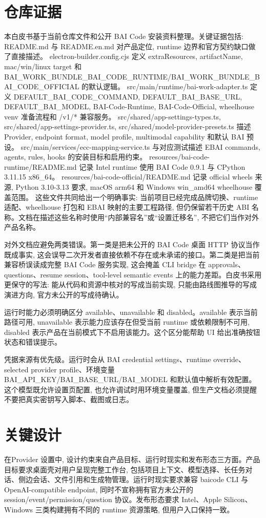 \section{仓库证据}
本白皮书基于当前仓库文件和公开 BAI Code 安装资料整理。关键证据包括: README.md 与 README.en.md 对产品定位, runtime 边界和官方契约缺口做了直接描述。 electron-builder.config.cjs 定义 extraResources, artifactName, mac/win/linux target 和 BAI\_WORK\_BUNDLE\_BAI\_CODE\_RUNTIME/BAI\_WORK\_BUNDLE\_BAI\_CODE\_OFFICIAL 的默认逻辑。 src/main/runtime/bai-work-adapter.ts 定义 DEFAULT\_BAI\_CODE\_COMMAND, DEFAULT\_BAI\_BASE\_URL, DEFAULT\_BAI\_MODEL, BAI-Code-Runtime, BAI-Code-Official, wheelhouse venv 准备流程和 /v1/* 兼容服务。 src/shared/app-settings-types.ts, src/shared/app-settings-provider.ts, src/shared/model-provider-presets.ts 描述 Provider, endpoint format, model profile, multimodal capability 和默认 BAI 预设。 src/main/services/ecc-mapping-service.ts 与对应测试描述 EBAI commands, agents, rules, hooks 的安装目标和启用约束。 resources/bai-code-runtime/README.md 记录 Intel runtime 使用 BAI Code 0.9.1 与 CPython 3.11.15 x86\_64。 resources/bai-code-official/README.md 记录 official wheels 来源, Python 3.10-3.13 要求, macOS arm64 和 Windows win\_amd64 wheelhouse 覆盖范围。 这些文件共同给出一个明确事实: 当前项目已经完成品牌切换、runtime 适配、wheelhouse 打包和 EBAI 映射的主要工程路径, 但仍保留若干历史 ABI 名称。文档在描述这些名称时使用“内部兼容名”或“设置迁移名”, 不把它们当作对外产品名称。

对外文档应避免两类错误。第一类是把未公开的 BAI Code 桌面 HTTP 协议当作既成事实, 这会误导二次开发者直接依赖不存在或未承诺的接口。第二类是把当前兼容桥误读成完整 BAI Code 服务实现, 这会掩盖 CLI bridge 在 approvals、questions、resume session、tool-level semantic events 上的能力差距。白皮书采用更保守的写法: 能从代码和资源中核对的写成当前实现, 只能由路线图推导的写成演进方向, 官方未公开的写成待确认。

运行时能力必须明确区分 available、unavailable 和 disabled。available 表示当前路径可用, unavailable 表示能力应该存在但受当前 runtime 或依赖限制不可用, disabled 表示产品在当前模式下不启用该能力。这个区分能帮助 UI 给出准确按钮状态和错误提示。

凭据来源有优先级。运行时会从 BAI credential settings、runtime override、selected provider profile、环境变量 BAI\_API\_KEY/BAI\_BASE\_URL/BAI\_MODEL 和默认值中解析有效配置。这个模型既允许设置页配置, 也允许调试时用环境变量覆盖, 但生产文档必须提醒不要把真实密钥写入脚本、截图或日志。

\section{关键设计}
在Provider 设置中, 设计约束来自产品目标、运行时现实和发布形态三方面。产品目标要求桌面壳对用户呈现完整工作台, 包括项目上下文、模型选择、长任务对话、侧边会话、文件引用和生成物管理。运行时现实要求兼容 baicode CLI 与 OpenAI-compatible endpoint, 同时不宣称拥有官方未公开的 session/event/permission/question 协议。发布形态要求 Intel、Apple Silicon、Windows 三类构建拥有不同的 runtime 资源策略, 但用户入口保持一致。

